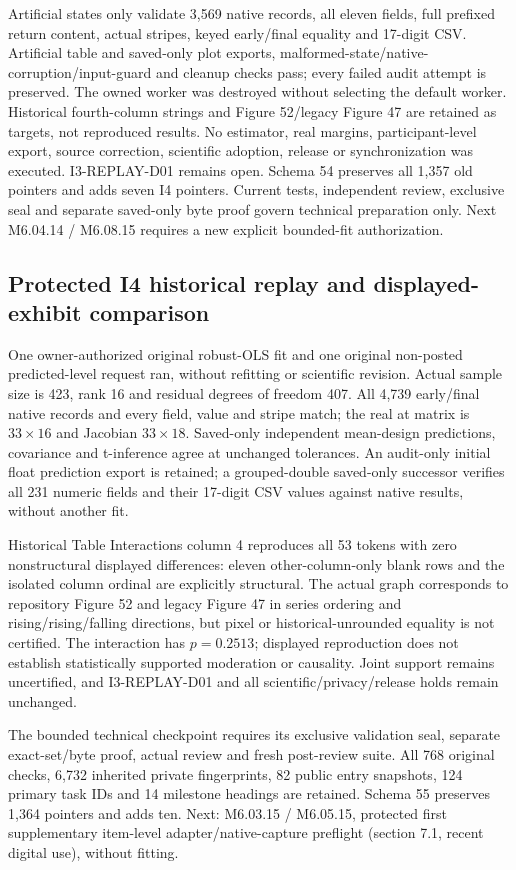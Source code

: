 \documentclass[11pt,a4paper]{article}
\begin{document}
Artificial states only validate 3,569 native records, all eleven fields, full prefixed return content, actual stripes, keyed early/final equality and 17-digit CSV. Artificial table and saved-only plot exports, malformed-state/native-corruption/input-guard and cleanup checks pass; every failed audit attempt is preserved. The owned worker was destroyed without selecting the default worker. Historical fourth-column strings and Figure 52/legacy Figure 47 are retained as targets, not reproduced results. No estimator, real margins, participant-level export, source correction, scientific adoption, release or synchronization was executed. I3-REPLAY-D01 remains open. Schema 54 preserves all 1,357 old pointers and adds seven I4 pointers. Current tests, independent review, exclusive seal and separate saved-only byte proof govern technical preparation only. Next M6.04.14 / M6.08.15 requires a new explicit bounded-fit authorization.

\subsection{Protected I4 historical replay and displayed-exhibit comparison}
One owner-authorized original robust-OLS fit and one original non-posted predicted-level request ran, without refitting or scientific revision. Actual sample size is 423, rank 16 and residual degrees of freedom 407. All 4,739 early/final native records and every field, value and stripe match; the real at matrix is $33\times16$ and Jacobian $33\times18$. Saved-only independent mean-design predictions, covariance and t-inference agree at unchanged tolerances. An audit-only initial float prediction export is retained; a grouped-double saved-only successor verifies all 231 numeric fields and their 17-digit CSV values against native results, without another fit.

Historical Table Interactions column 4 reproduces all 53 tokens with zero nonstructural displayed differences: eleven other-column-only blank rows and the isolated column ordinal are explicitly structural. The actual graph corresponds to repository Figure 52 and legacy Figure 47 in series ordering and rising/rising/falling directions, but pixel or historical-unrounded equality is not certified. The interaction has $p=0.2513$; displayed reproduction does not establish statistically supported moderation or causality. Joint support remains uncertified, and I3-REPLAY-D01 and all scientific/privacy/release holds remain unchanged.

The bounded technical checkpoint requires its exclusive validation seal, separate exact-set/byte proof, actual review and fresh post-review suite. All 768 original checks, 6,732 inherited private fingerprints, 82 public entry snapshots, 124 primary task IDs and 14 milestone headings are retained. Schema 55 preserves 1,364 pointers and adds ten. Next: M6.03.15 / M6.05.15, protected first supplementary item-level adapter/native-capture preflight (section 7.1, recent digital use), without fitting.
\end{document}
